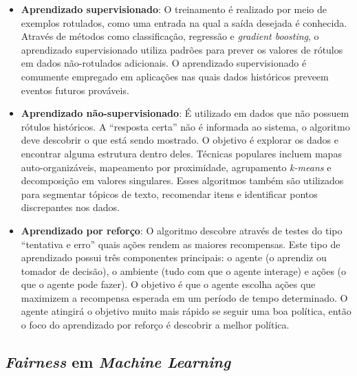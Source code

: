 \documentclass[twocolumn]{article}
\begin{document}
\begin{itemize}
\item \textbf{Aprendizado supervisionado}: O treinamento é realizado por meio de exemplos rotulados, como uma entrada na qual a saída desejada é conhecida. Através de métodos como classificação, regressão e \textit{gradient boosting}, o aprendizado supervisionado utiliza padrões para prever os valores de rótulos em dados não-rotulados adicionais. O aprendizado supervisionado é comumente empregado em aplicações nas quais dados históricos preveem eventos futuros prováveis.
\item \textbf{Aprendizado não-supervisionado}: É utilizado em dados que não possuem rótulos históricos. A “resposta certa” não é informada ao sistema, o algoritmo deve descobrir o que está sendo mostrado. O objetivo é explorar os dados e encontrar alguma estrutura dentro deles. Técnicas populares incluem mapas auto-organizáveis, mapeamento por proximidade, agrupamento \textit{k-means} e decomposição em valores singulares. Esses algoritmos também são utilizados para segmentar tópicos de texto, recomendar itens e identificar pontos discrepantes nos dados.
\item \textbf{Aprendizado por reforço}: O algoritmo descobre através de testes do tipo “tentativa e erro” quais ações rendem as maiores recompensas. Este tipo de aprendizado possui três componentes principais: o agente (o aprendiz ou tomador de decisão), o ambiente (tudo com que o agente interage) e ações (o que o agente pode fazer). O objetivo é que o agente escolha ações que maximizem a recompensa esperada em um período de tempo determinado. O agente atingirá o objetivo muito mais rápido se seguir uma boa política, então o foco do aprendizado por reforço é descobrir a melhor política.
\end{itemize}

\subsection{\textit{Fairness} em \textit{Machine Learning}}
\end{document}
